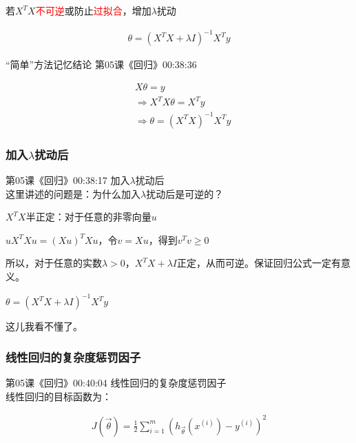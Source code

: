 \documentclass[UTF8]{ctexbook}
\begin{document}
若$X^{T}X$\textcolor{red}{不可逆}或防止\textcolor{red}{过拟合}，增加$\lambda$扰动

\begin{equation}
\begin{aligned}
\theta=(X^{T}X+\lambda I)^{-1} X^{T}y
\end{aligned}
\end{equation}


“简单”方法记忆结论 第05课《回归》00:38:36

\begin{equation}
\begin{aligned}
&X\theta=y\\
&\Rightarrow X^{T}X\theta=X^{T}y\\
&\Rightarrow \theta = (X^{T}X)^{-1} X^{T}y
\end{aligned}
\end{equation}

\subsubsection{加入$\lambda$扰动后}

第05课《回归》00:38:17 加入$\lambda$扰动后\\

这里讲述的问题是：为什么加入$\lambda$扰动后是可逆的？

$X^{T}X$半正定：对于任意的非零向量$u$

$uX^{T}Xu=(Xu)^{T}Xu$，令$v=Xu$，得到$v^{T}v \geq 0$

所以，对于任意的实数$\lambda > 0$，$X^{T}X+\lambda I$正定，从而可逆。保证回归公式一定有意义。

$\theta = (X^{T}X+\lambda I)^{-1} X^{T}y$

这儿我看不懂了。

\subsubsection{线性回归的复杂度惩罚因子}

第05课《回归》00:40:04 线性回归的复杂度惩罚因子\\

线性回归的目标函数为：

\begin{equation}
\begin{aligned}
J(\vec{\theta})=\frac{1}{2}\sum_{i=1}^{m} \left ( h_{\vec{\theta}}(x^{(i)}) - y^{(i)} \right )^{2}
\end{aligned}
\end{equation}
\end{document}
